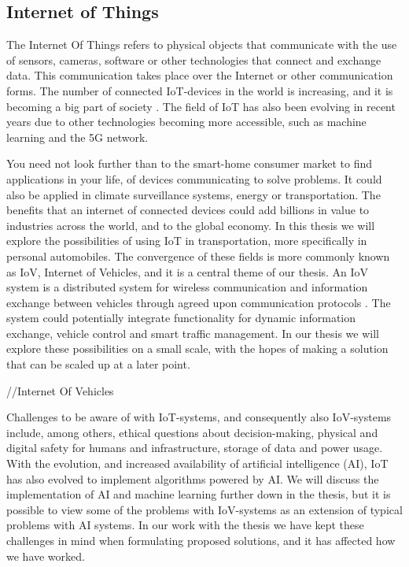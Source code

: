 \subsection{Internet of Things}

The Internet Of Things refers to physical objects that communicate with the use of sensors, cameras, software or other technologies that connect and exchange data. This communication takes place over the Internet or other communication forms. The number of connected IoT-devices in the world is increasing, and it is becoming a big part of society \parencite{iot_analytics}. The field of IoT has also been evolving in recent years due to other technologies becoming more accessible, such as machine learning and the 5G network.

You need not look further than to the smart-home consumer market to find applications in your life, of devices communicating to solve problems. It could also be applied in climate surveillance systems, energy or transportation. The benefits that an internet of connected devices could add billions in value to industries across the world, and to the global economy. In this thesis we will explore the possibilities of using IoT in transportation, more specifically in personal automobiles. The convergence of these fields is more commonly known as IoV, Internet of Vehicles, and it is a central theme of our thesis. An IoV system is a distributed system for wireless communication and information exchange between vehicles through agreed upon communication protocols \parencite{chinese_iov}.  The system could potentially integrate functionality for dynamic information exchange, vehicle control and  smart traffic management. In our thesis we will explore these possibilities on a small scale, with the hopes of making a solution that can be scaled up at a later point. 

//Internet Of Vehicles

Challenges to be aware of with IoT-systems, and consequently also IoV-systems include, among others, ethical questions about decision-making, physical and digital safety for humans and infrastructure, storage of data and power usage. With the evolution, and increased availability of artificial intelligence (AI), IoT has also evolved to implement algorithms powered by AI. We will discuss the implementation of AI and machine learning further down in the thesis, but it is possible to view some of the problems with IoV-systems as an extension of typical problems with AI systems. In our work with the thesis we have kept these challenges in mind when formulating proposed solutions, and it has affected how we have worked.